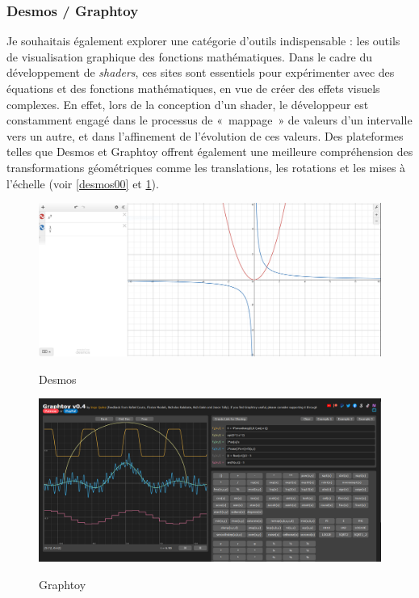 \subsubsection*{Desmos / Graphtoy}

Je souhaitais également explorer une catégorie d'outils indispensable : les outils de visualisation graphique des fonctions mathématiques. Dans le cadre du développement de \textit{shaders}, ces sites sont essentiels pour expérimenter avec des équations et des fonctions mathématiques, en vue de créer des effets visuels complexes. En effet, lors de la conception d'un shader, le développeur est constamment engagé dans le processus de «~mappage~» de valeurs d'un intervalle vers un autre, et dans l'affinement de l'évolution de ces valeurs. Des plateformes telles que Desmos et Graphtoy offrent également une meilleure compréhension des transformations géométriques comme les translations, les rotations et les mises à l'échelle (voir \ref{desmos00} et \ref{graphtoy00}).

\begin{figure}[h]
  \begin{minipage}[b]{0.45\linewidth}
    \centering
    \includegraphics[width=\linewidth]{images/demoscene/desmos00.PNG}
    \label{desmos00}
    \caption{Desmos}
  \end{minipage}
  \hfill
  \begin{minipage}[b]{0.45\linewidth}
    \centering
    \includegraphics[width=\linewidth]{images/demoscene/graphtoy00.PNG}
    \label{graphtoy00}
    \caption{Graphtoy}
  \end{minipage}  
\end{figure}



